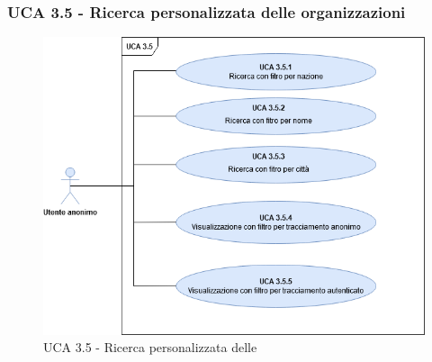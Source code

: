 \subsubsection{UCA 3.5 - Ricerca personalizzata delle organizzazioni}%
\begin{figure}[h]
	\centering
	
	\includegraphics[scale=0.5, center]{Sezioni/UseCase/Immagini/UCA3.5.png}
	\caption{UCA 3.5 - Ricerca personalizzata delle }
\end{figure}

